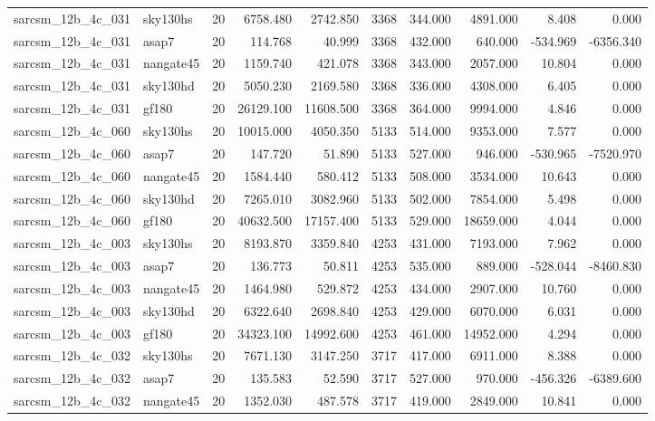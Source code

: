 \begin{tabular}{llrrrrrrrr}
sarcsm\_12b\_4c\_031 & sky130hs & 20 & 6758.480 & 2742.850 & 3368 & 344.000 & 4891.000 & 8.408 & 0.000 \\
sarcsm\_12b\_4c\_031 & asap7 & 20 & 114.768 & 40.999 & 3368 & 432.000 & 640.000 & -534.969 & -6356.340 \\
sarcsm\_12b\_4c\_031 & nangate45 & 20 & 1159.740 & 421.078 & 3368 & 343.000 & 2057.000 & 10.804 & 0.000 \\
sarcsm\_12b\_4c\_031 & sky130hd & 20 & 5050.230 & 2169.580 & 3368 & 336.000 & 4308.000 & 6.405 & 0.000 \\
sarcsm\_12b\_4c\_031 & gf180 & 20 & 26129.100 & 11608.500 & 3368 & 364.000 & 9994.000 & 4.846 & 0.000 \\
sarcsm\_12b\_4c\_060 & sky130hs & 20 & 10015.000 & 4050.350 & 5133 & 514.000 & 9353.000 & 7.577 & 0.000 \\
sarcsm\_12b\_4c\_060 & asap7 & 20 & 147.720 & 51.890 & 5133 & 527.000 & 946.000 & -530.965 & -7520.970 \\
sarcsm\_12b\_4c\_060 & nangate45 & 20 & 1584.440 & 580.412 & 5133 & 508.000 & 3534.000 & 10.643 & 0.000 \\
sarcsm\_12b\_4c\_060 & sky130hd & 20 & 7265.010 & 3082.960 & 5133 & 502.000 & 7854.000 & 5.498 & 0.000 \\
sarcsm\_12b\_4c\_060 & gf180 & 20 & 40632.500 & 17157.400 & 5133 & 529.000 & 18659.000 & 4.044 & 0.000 \\
sarcsm\_12b\_4c\_003 & sky130hs & 20 & 8193.870 & 3359.840 & 4253 & 431.000 & 7193.000 & 7.962 & 0.000 \\
sarcsm\_12b\_4c\_003 & asap7 & 20 & 136.773 & 50.811 & 4253 & 535.000 & 889.000 & -528.044 & -8460.830 \\
sarcsm\_12b\_4c\_003 & nangate45 & 20 & 1464.980 & 529.872 & 4253 & 434.000 & 2907.000 & 10.760 & 0.000 \\
sarcsm\_12b\_4c\_003 & sky130hd & 20 & 6322.640 & 2698.840 & 4253 & 429.000 & 6070.000 & 6.031 & 0.000 \\
sarcsm\_12b\_4c\_003 & gf180 & 20 & 34323.100 & 14992.600 & 4253 & 461.000 & 14952.000 & 4.294 & 0.000 \\
sarcsm\_12b\_4c\_032 & sky130hs & 20 & 7671.130 & 3147.250 & 3717 & 417.000 & 6911.000 & 8.388 & 0.000 \\
sarcsm\_12b\_4c\_032 & asap7 & 20 & 135.583 & 52.590 & 3717 & 527.000 & 970.000 & -456.326 & -6389.600 \\
sarcsm\_12b\_4c\_032 & nangate45 & 20 & 1352.030 & 487.578 & 3717 & 419.000 & 2849.000 & 10.841 & 0.000 \\

\end{tabular}
